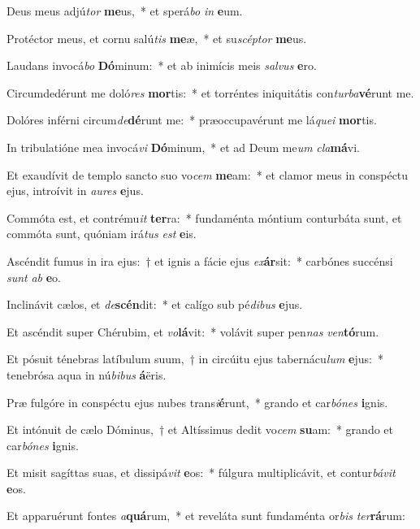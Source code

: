 \item Deus meus adjú\textit{tor} \textbf{me}us,~* et sperá\textit{bo} \textit{in} \textbf{e}um.
\item Protéctor meus, et cornu salú\textit{tis} \textbf{me}æ,~* et su\textit{scép}\textit{tor} \textbf{me}us.
\item Laudans invocá\textit{bo} \textbf{Dó}minum:~* et ab inimícis meis \textit{sal}\textit{vus} \textbf{e}ro.
\item Circumdedérunt me doló\textit{res} \textbf{mor}tis:~* et torréntes iniquitátis con\textit{tur}\textit{ba}\textbf{vé}runt me.
\item Dolóres inférni circum\textit{de}\textbf{dé}runt me:~* præoccupavérunt me lá\textit{que}\textit{i} \textbf{mor}tis.
\item In tribulatióne mea invocá\textit{vi} \textbf{Dó}minum,~* et ad Deum me\textit{um} \textit{cla}\textbf{má}vi.
\item Et exaudívit de templo sancto suo vo\textit{cem} \textbf{me}am:~* et clamor meus in conspéctu ejus, introívit in \textit{au}\textit{res} \textbf{e}jus.
\item Commóta est, et contrému\textit{it} \textbf{ter}ra:~* fundaménta móntium conturbáta sunt, et commóta sunt, quóniam irá\textit{tus} \textit{est} \textbf{e}is.
\item Ascéndit fumus in ira ejus:~† et ignis a fácie ejus \textit{ex}\textbf{ár}sit:~* carbónes succénsi \textit{sunt} \textit{ab} \textbf{e}o.
\item Inclinávit cælos, et \textit{de}\textbf{scén}dit:~* et calígo sub pé\textit{di}\textit{bus} \textbf{e}jus.
\item Et ascéndit super Chérubim, et \textit{vo}\textbf{lá}vit:~* volávit super pen\textit{nas} \textit{ven}\textbf{tó}rum.
\item Et pósuit ténebras latíbulum suum,~† in circúitu ejus tabernácu\textit{lum} \textbf{e}jus:~* tenebrósa aqua in nú\textit{bi}\textit{bus} \textbf{á}ëris.
\item Præ fulgóre in conspéctu ejus nubes trans\textit{i}\textbf{é}runt,~* grando et car\textit{bó}\textit{nes} \textbf{i}gnis.
\item Et intónuit de cælo Dóminus,~† et Altíssimus dedit vo\textit{cem} \textbf{su}am:~* grando et car\textit{bó}\textit{nes} \textbf{i}gnis.
\item Et misit sagíttas suas, et dissipá\textit{vit} \textbf{e}os:~* fúlgura multiplicávit, et contur\textit{bá}\textit{vit} \textbf{e}os.
\item Et apparuérunt fontes \textit{a}\textbf{quá}rum,~* et reveláta sunt fundaménta or\textit{bis} \textit{ter}\textbf{rá}rum:

